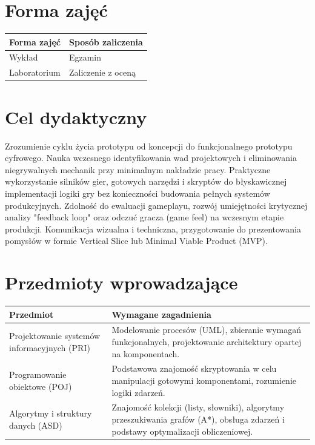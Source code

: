\documentclass[12pt, a4paper]{article}
\begin{document}
\section{Forma zajęć}

\begin{tabular}{ll}
  \hline
  \textbf{Forma zajęć} & \textbf{Sposób zaliczenia} \\
  \hline
  Wykład & Egzamin \\
  Laboratorium & Zaliczenie z oceną \\
  \hline
\end{tabular}

\section{Cel dydaktyczny}

Zrozumienie cyklu życia prototypu od koncepcji do funkcjonalnego prototypu cyfrowego. Nauka wczesnego identyfikowania wad projektowych i eliminowania niegrywalnych mechanik przy minimalnym nakładzie pracy. Praktyczne wykorzystanie silników gier, gotowych narzędzi i skryptów do błyskawicznej implementacji logiki gry bez konieczności budowania pełnych systemów produkcyjnych. Zdolność do ewaluacji gameplayu, rozwój umiejętności krytycznej analizy "feedback loop" oraz odczuć gracza (game feel) na wczesnym etapie produkcji. Komunikacja wizualna i techniczna, przygotowanie do prezentowania pomysłów w formie Vertical Slice lub Minimal Viable Product (MVP).

\section{Przedmioty wprowadzające}

\begin{tabularx}{\textwidth}{lX}
  \hline
  \textbf{Przedmiot} & \textbf{Wymagane zagadnienia} \\
  \hline
  Projektowanie systemów informacyjnych (PRI) & Modelowanie procesów (UML), zbieranie wymagań funkcjonalnych, projektowanie architektury opartej na komponentach. \\
  Programowanie obiektowe	(POJ) & Podstawowa znajomość skryptowania w celu manipulacji gotowymi komponentami, rozumienie logiki zdarzeń. \\
  Algorytmy i struktury danych (ASD) & Znajomość kolekcji (listy, słowniki), algorytmy przeszukiwania grafów (A*), obsługa zdarzeń i podstawy optymalizacji obliczeniowej. \\
  \hline
\end{tabularx}
\end{document}
